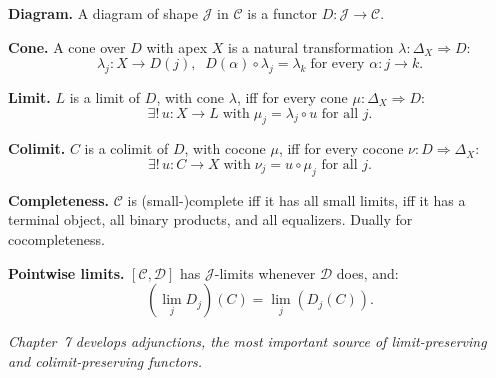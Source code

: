 \begin{formalrestatement}
\textbf{Diagram.}\quad
A diagram of shape $\mathcal{J}$ in $\mathcal{C}$ is a functor
$D : \mathcal{J} \to \mathcal{C}$.

\medskip
\textbf{Cone.}\quad
A cone over $D$ with apex $X$ is a natural transformation
$\lambda : \Delta_X \Rightarrow D$:
\begin{equation*}
  \lambda_j : X \to D(j),\;\;
  D(\alpha) \circ \lambda_j = \lambda_k
  \;\text{for every } \alpha : j \to k.
\end{equation*}

\medskip
\textbf{Limit.}\quad
$L$ is a limit of $D$, with cone $\lambda$, iff for every cone
$\mu : \Delta_X \Rightarrow D$:
\begin{equation*}
  \exists !\, u : X \to L \;\text{with}\;
  \mu_j = \lambda_j \circ u \text{ for all } j.
\end{equation*}

\medskip
\textbf{Colimit.}\quad
$C$ is a colimit of $D$, with cocone $\mu$, iff for every cocone
$\nu : D \Rightarrow \Delta_X$:
\begin{equation*}
  \exists !\, u : C \to X \;\text{with}\;
  \nu_j = u \circ \mu_j \text{ for all } j.
\end{equation*}

\medskip
\textbf{Completeness.}\quad
$\mathcal{C}$ is (small-)complete iff it has all small limits, iff it has
a terminal object, all binary products, and all equalizers. Dually for
cocompleteness.

\medskip
\textbf{Pointwise limits.}\quad
$[\mathcal{C}, \mathcal{D}]$ has $\mathcal{J}$-limits whenever
$\mathcal{D}$ does, and:
\begin{equation*}
  (\lim_j D_j)(C) = \lim_j (D_j(C)).
\end{equation*}

\medskip
\noindent\textit{Chapter~7 develops adjunctions, the most important
source of limit-preserving and colimit-preserving functors.}
\end{formalrestatement}
